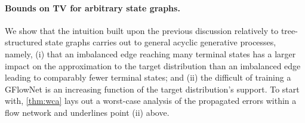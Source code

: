 \documentclass{article}
\theoremstyle{plain}
\newtheorem{theorem}{Theorem}[section]
\theoremstyle{definition}
\theoremstyle{remark}
\theoremstyle{remark}
\begin{document}


\paragraph{Bounds on TV for arbitrary state graphs.} We show that the intuition built upon the previous discussion relatively to tree-structured state graphs carries out to general acyclic generative processes, namely, (i) that an imbalanced edge reaching many terminal states has a larger impact on the approximation to the target distribution than an imbalanced edge leading to comparably fewer terminal states; and (ii) the difficult of training a GFlowNet is an increasing function of the target distribution's support. To start with, \autoref{thm:wca} lays out a worst-case analysis of the propagated errors within a flow network and underlines point (ii) above. 
\end{document}
